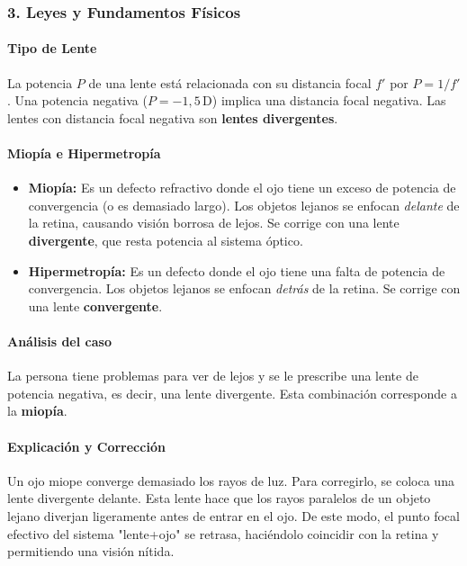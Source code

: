 \subsubsection*{3. Leyes y Fundamentos Físicos}
\paragraph*{Tipo de Lente}
La potencia $P$ de una lente está relacionada con su distancia focal $f'$ por $P=1/f'$. Una potencia negativa ($P = -1,5\,\text{D}$) implica una distancia focal negativa. Las lentes con distancia focal negativa son \textbf{lentes divergentes}.

\paragraph*{Miopía e Hipermetropía}
\begin{itemize}
    \item \textbf{Miopía:} Es un defecto refractivo donde el ojo tiene un exceso de potencia de convergencia (o es demasiado largo). Los objetos lejanos se enfocan \textit{delante} de la retina, causando visión borrosa de lejos. Se corrige con una lente \textbf{divergente}, que resta potencia al sistema óptico.
    \item \textbf{Hipermetropía:} Es un defecto donde el ojo tiene una falta de potencia de convergencia. Los objetos lejanos se enfocan \textit{detrás} de la retina. Se corrige con una lente \textbf{convergente}.
\end{itemize}

\paragraph*{Análisis del caso}
La persona tiene problemas para ver de lejos y se le prescribe una lente de potencia negativa, es decir, una lente divergente. Esta combinación corresponde a la \textbf{miopía}.

\paragraph*{Explicación y Corrección}
Un ojo miope converge demasiado los rayos de luz. Para corregirlo, se coloca una lente divergente delante. Esta lente hace que los rayos paralelos de un objeto lejano diverjan ligeramente antes de entrar en el ojo. De este modo, el punto focal efectivo del sistema "lente+ojo" se retrasa, haciéndolo coincidir con la retina y permitiendo una visión nítida.


